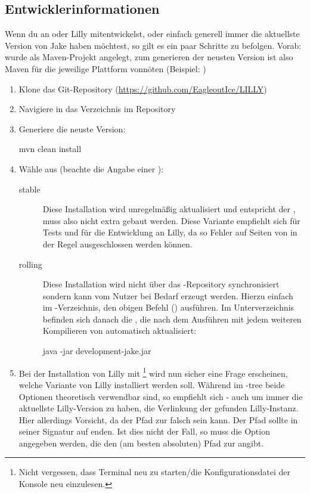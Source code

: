 \subsection{Entwicklerinformationen}
Wenn du an \Jake oder Lilly mitentwickelst, oder einfach generell immer die aktuellste Version von Jake haben möchtest, so gilt es ein paar Schritte zu befolgen. Vorab: \Jake wurde als Maven-Projekt angelegt, zum generieren der neusten Version ist also Maven für die jeweilige Plattform vonnöten (Beispiel: )
\begin{enumerate}\narrowitems
    \item Klone das Git-Repository (\url{https://github.com/EagleoutIce/LILLY})
    \item Navigiere in das Verzeichnis  im Repository
    \item Generiere die neuste \Jake[-]Version: \begin{bash*}
mvn clean install
        \end{bash*}
    \item Wähle aus (beachte die Angabe einer ): \begin{description}
        \item[stable] Diese Installation wird unregelmäßig aktualisiert und entspricht der , muss also nicht extra gebaut werden. Diese Variante empfiehlt sich für Tests und für die Entwicklung an Lilly, da so Fehler auf Seiten von \Jake in der Regel ausgeschlossen werden können.
        \item[rolling] Diese Installation wird nicht über das -Repository synchronisiert sondern kann vom Nutzer bei Bedarf erzeugt werden. Hierzu einfach im -Verzeichnis, den obigen Befehl () ausführen. Im Unterverzeichnis  befinden sich danach die , die nach dem Ausführen mit jedem weiteren Kompilieren von \Jake automatisch aktualisiert: \begin{bash*}
java -jar development-jake.jar
        \end{bash*}
    \end{description}
    \item Bei der Installation von Lilly mit \footnote{Nicht vergessen, dass Terminal neu zu starten/die Konfigurationsdatei der Konsole neu einzulesen.} wird nun sicher eine Frage erscheinen, welche Variante von Lilly installiert werden soll. Während im -tree beide Optionen theoretisch verwendbar sind, so empfiehlt sich - auch um immer die aktuellste Lilly-Version zu haben, die Verlinkung der gefunden Lilly-Instanz. Hier allerdings Vorsicht, da der Pfad zur  falsch sein kann. Der Pfad sollte in seiner Signatur auf  enden. Ist dies nicht der Fall, so muss die Option  angegeben werden, die den (am besten absoluten) Pfad zur  angibt.
\end{enumerate}

